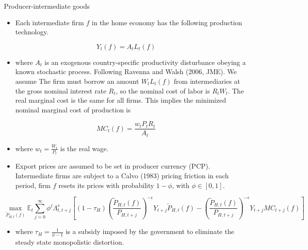 \documentclass[10pt]{beamer}
\begin{document}
\begin{frame}{Producer-intermediate goods}

\fontsize{8}{8}\selectfont

\begin{itemize}
    \item Each intermediate firm $f$ in the home economy has the following production technology.
\end{itemize}

$$
Y_{t}(f)=A_{t} L_{t}(f)
$$

\begin{itemize}
    \item where $A_{t}$ is an exogenous country-specific productivity disturbance obeying a known stochastic process. Following Ravenna and Walsh (2006, JME). We assume The firm must borrow an amount $W_tL_t(f)$ from intermediaries at the gross nominal interest rate $R_t$, so the nominal cost of labor is $R_tW_t$. The real marginal cost is the same for all firms. This implies the minimized nominal marginal cost of production is
\end{itemize}

$$
M C_{t}(f)=\frac{w_{t} P_{t}R_{t}}{A_{t}}
$$

\begin{itemize}
    \item where $w_{t}=\frac{W_{t}}{P_{t}}$ is the real wage.
\end{itemize}


\begin{itemize}
    \item Export prices are assumed to be set in producer currency (PCP). Intermediate firms are subject to a Calvo (1983) pricing friction in each period, firm $f$ resets its prices with probability $1-\phi$, with $\phi \in[0,1]$.
\end{itemize}

$$
\max _{\tilde{P}_{H, t}(f)} \mathbb{E}_{t} \sum_{j=0}^{\infty} \phi^{j} \Lambda_{t, t+j}^{s}\left[\left(1-\tau_{H}\right)\left(\frac{\tilde{P}_{H, t}(f)}{P_{H, t+j}}\right)^{-\epsilon} Y_{t+j} \tilde{P}_{H, t}(f)-\left(\frac{\tilde{P}_{H, t}(f)}{P_{H, t+j}}\right)^{-\epsilon} Y_{t+j} M C_{t+j}(f)\right]
$$

\begin{itemize}
    \item where $\tau_{H}=\frac{1}{\phi-1}$ is a subsidy imposed by the government to eliminate the steady state monopolistic distortion.
\end{itemize}

\end{frame}
\end{document}
